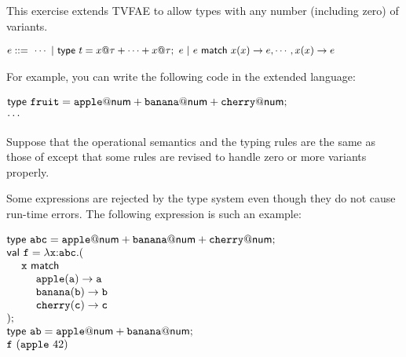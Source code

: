 \begin{exercise}

This exercise extends \textsf{TVFAE} to allow types with any number (including zero) of variants.

\vspace{0.5em}
$
    \small
  \begin{array}{@{}l}
    e ::=\ \cdots\ |\ {\textsf{type}}\ t=x@\tau+\cdots+x@\tau;\ e\ |\
           e\ {\textsf{match}}\ x(x)\rightarrow e,\cdots,x(x)\rightarrow e \\
  \end{array}
$

For example, you can write the following code in the extended language:

\vspace{0.5em}
$
  \begin{array}{@{}l}
    {\textsf{type}}\ \code{fruit}=\code{apple}@\tnum+\code{banana}@\tnum+\code{cherry}@\tnum;\\
    \cdots
  \end{array}
$
\vspace{0.5em}

Suppose that the operational semantics and the typing rules are the same as
those of \code{TVFAE} except that some rules are revised to handle zero or more
variants properly.

Some expressions are rejected by the type system even though
they do not cause run-time errors. The following expression is such an example:

\vspace{0.5em}
$
  \begin{array}{@{}l}
    \textsf{type}\ \code{abc}=\code{apple}@\tnum+\code{banana}@\tnum+\code{cherry}@\tnum;\\
    \textsf{val}\ \code{f}=\efun{\code{x}{:}\code{abc}}{(}\\
    \ \ \ \ \code{x}\ \textsf{match} \\
    \ \ \ \ \ \ \ \ \code{apple}(\code{a})\rightarrow\code{a} \\
    \ \ \ \ \ \ \ \ \code{banana}(\code{b})\rightarrow\code{b} \\
    \ \ \ \ \ \ \ \ \code{cherry}(\code{c})\rightarrow\code{c} \\
    );\\
    \textsf{type}\ \code{ab}=\code{apple}@\tnum+\code{banana}@\tnum;\\
    \eapp{\code{f}}{(\eapp{\code{apple}}{42})}
  \end{array}
$
\vspace{0.5em}


\end{exercise}
